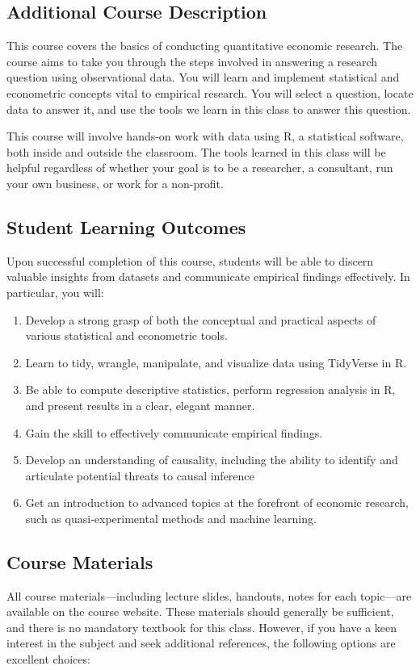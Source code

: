\documentclass{./../Latex/syllabus}
\begin{document}
\subsection*{Additional Course Description}
This course covers the basics of conducting quantitative economic research. The course aims to take you through the steps involved in answering a research question using observational data. You will learn and implement statistical and econometric concepts vital to empirical research. You will select a question, locate data to answer it, and use the tools we learn in this class to answer this question.

This course will involve hands-on work with data using $\mathrm{R}$, a statistical software, both inside and outside the classroom. The tools learned in this class will be helpful regardless of whether your goal is to be a researcher, a consultant, run your own business, or work for a non-profit.

\subsection*{Student Learning Outcomes}
Upon successful completion of this course, students will be able to discern valuable insights from datasets and communicate empirical findings effectively. In particular, you will:
\begin{enumerate}
\itemsep0em 
  \item Develop a strong grasp of both the conceptual and practical aspects of various statistical and econometric tools.
  \item Learn to tidy, wrangle, manipulate, and visualize data using TidyVerse in $\mathrm{R}$.
  \item Be able to compute descriptive statistics, perform regression analysis in R, and present results in a clear, elegant manner.
  \item Gain the skill to effectively communicate empirical findings.
  \item Develop an understanding of causality, including the ability to identify and articulate potential threats to causal inference
  \item Get an introduction to advanced topics at the forefront of economic research, such as quasi-experimental methods and machine learning.
\end{enumerate}


\subsection*{Course Materials}
All course materials---including lecture slides, handouts, notes for each topic—are available on the course website. These materials should generally be sufficient, and there is no mandatory textbook for this class. However, if you have a keen interest in the subject and seek additional references, the following options are excellent choices:
\end{document}
